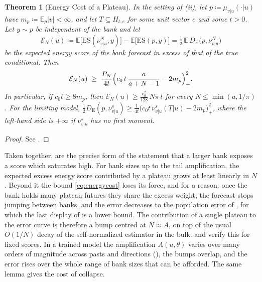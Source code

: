 \documentclass[11pt]{article}
\theoremstyle{plain}
\newtheorem{theorem}{Theorem}[section]
\theoremstyle{definition}
\theoremstyle{remark}
\newcommand{\E}{\mathbb{E}}
\newcommand{\define}{\coloneqq}
\newcommand{\DE}{D_{\mathrm{E}}}
\newcommand{\abs}[1]{\left\lvert #1 \right\rvert}
\begin{document}
\begin{theorem}[Energy Cost of a Plateau]
 \label{thm:energycost}
 In the setting of (ii), let $p\define\mu_{v\vert u}(\cdot\vert u)$
 have $m_p\define\E_p\abs{v}<\infty$, and let $T\subseteq H_{t,e}$ for some
 unit vector $e$ and some $t>0$. Let $y\sim p$ be independent of the bank and
 let
 \begin{equation*}
  \mathcal{E}_N(u)\define\E\bigl[\mathrm{ES}(\nu^{N}_{v\vert u},y)\bigr]-\E\bigl[\mathrm{ES}(p,y)\bigr]
  =\tfrac12\,\E\,\DE\bigl(p,\nu^{N}_{v\vert u}\bigr)
 \end{equation*}
 be the expected energy score of the bank forecast in excess of that of the
 true conditional. Then
 \begin{equation}
  \mathcal{E}_N(u)\;\ge\;\frac{P_N}{4t}\Bigl(c_0\,t\,\frac{a}{a+N-1}-2m_p\Bigr)_{+}^{2}.
  \label{eq:energycost}
 \end{equation}
 In particular, if $c_0t\ge8m_p$, then
 $\mathcal{E}_N(u)\ge\frac{c_0^{2}}{128}\,N\pi\,t$ for every $N\le\min(a,1/\pi)$.
 For the limiting model,
 $\tfrac12\DE(p,\nu^{s}_{v\vert u})\ge\frac{1}{4t}\bigl(c_0t\,\nu^{s}_{v\vert u}(T\vert u)-2m_p\bigr)_{+}^{2}$,
 where the left-hand side is $+\infty$ if $\nu^{s}_{v\vert u}$ has no first
 moment.
\end{theorem}
\begin{proof}
 See .
\end{proof}

Taken together,  are the precise form of
the statement that a larger bank exposes a score which saturates high. For
bank sizes up to the tail amplification, the expected excess energy score
contributed by a plateau grows at least linearly in $N$. Beyond it the bound
\eqref{eq:energycost} loses its force, and for a reason: once the bank holds
many plateau futures they share the excess weight, the forecast stops jumping
between banks, and the error decreases to the population error of
, for which the last display of  is a
lower bound. The contribution of a single plateau to the error curve is
therefore a bump centred at $N\approx A$, on top of the usual $O(1/N)$ decay
of the self-normalized estimator in the bulk.  and
 verify this for fixed scores. In a trained model the amplification $A(u,\theta)$ varies over
many orders of magnitude across pasts and directions
(), the bumps overlap, and the error rises over the
whole range of bank sizes that can be afforded. The same lemma gives the cost
of collapse.
\end{document}

